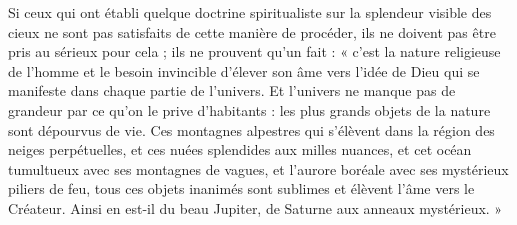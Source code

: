 \documentclass[a4paper, 11pt, oneside, landscape]{article}
\begin{document}
Si ceux qui ont établi quelque doctrine spiritualiste sur la splendeur visible des cieux ne sont pas satisfaits de cette manière de procéder, ils ne doivent pas être pris au sérieux pour cela ; ils ne prouvent qu'un fait : « c'est la nature religieuse de l'homme et le besoin invincible d'élever son âme vers l'idée de Dieu qui se manifeste dans chaque partie de l'univers. Et l'univers ne manque pas de grandeur par ce qu'on le prive d'habitants : les plus grands objets de la nature sont dépourvus de vie. Ces montagnes alpestres qui s'élèvent dans la région des neiges perpétuelles, et ces nuées splendides aux milles nuances, et cet océan tumultueux avec ses montagnes de vagues, et l'aurore boréale avec ses mystérieux piliers de feu, tous ces objets inanimés sont sublimes et élèvent l'âme vers le Créateur. Ainsi en est-il du beau Jupiter, de Saturne aux anneaux mystérieux. »
\end{document}
